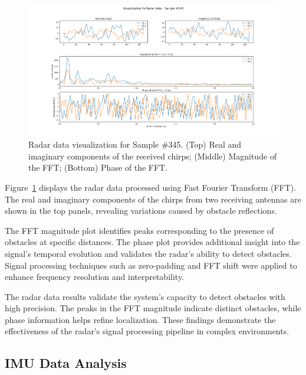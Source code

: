 \documentclass[12pt,a4paper]{article}
\begin{document}
\begin{figure}[h!]
    \centering
    \includegraphics[width=\textwidth]{Radar_sample_345.png}
    \caption{Radar data visualization for Sample \#345. (Top) Real and imaginary components of the received chirps; (Middle) Magnitude of the FFT; (Bottom) Phase of the FFT.}
    \label{fig:Radar}
\end{figure}

Figure~\ref{fig:Radar} displays the radar data processed using Fast Fourier Transform (FFT). The real and imaginary components of the chirps from two receiving antennas are shown in the top panels, revealing variations caused by obstacle reflections. 

The FFT magnitude plot identifies peaks corresponding to the presence of obstacles at specific distances. The phase plot provides additional insight into the signal's temporal evolution and validates the radar's ability to detect obstacles. Signal processing techniques such as zero-padding and FFT shift were applied to enhance frequency resolution and interpretability.

The radar data results validate the system's capacity to detect obstacles with high precision. The peaks in the FFT magnitude indicate distinct obstacles, while phase information helps refine localization. These findings demonstrate the effectiveness of the radar's signal processing pipeline in complex environments.

\subsection{IMU Data Analysis}
\end{document}
